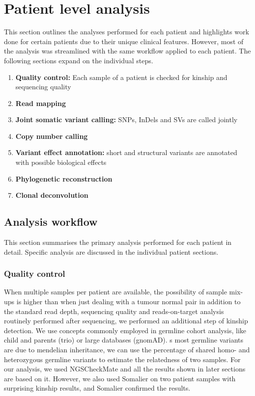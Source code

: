 \section{Patient level analysis}
\label{cascade-sec:patientLevel}
This section outlines the analyses performed for each patient and highlights work  done  for certain patients due to their unique clinical features. However, most of the analysis was streamlined with the same workflow applied to each patient. The following sections expand on the individual steps.
\begin{enumerate}
\item \textbf{Quality control:} Each sample of a patient is checked for kinship and sequencing quality
\item \textbf{Read mapping}
\item \textbf{Joint somatic variant calling:} SNPs, InDels and SVs are called jointly
\item \textbf{Copy number calling}
\item \textbf{Variant effect annotation:} short and structural variants are annotated with possible biological effects
\item \textbf{Phylogenetic reconstruction}
\item \textbf{Clonal deconvolution}
\end{enumerate}


\subsection{Analysis workflow}
\label{cascade-sec:workflow}
This section summarises the primary analysis performed for each patient in detail. Specific analysis are discussed in the individual patient sections. 

\subsubsection{Quality control}
\label{cascade-sec:qc}
When multiple samples per patient are available, the possibility of sample mix-ups is higher than when just dealing with a tumour normal pair in addition to the standard read depth, sequencing quality and reads-on-target analysis  routinely performed after sequencing, we performed an additional step of kinship detection. We use concepts commonly employed in germline cohort analysis, like child and parents (trio) or  large databases (gnomAD). s most germline variants are due to mendelian inheritance, we can use the percentage of shared homo- and heterozygous germline variants to estimate the relatedness of two samples. For our analysis, we used NGSCheckMate \cite{Lee2017} and all the results shown in later sections are based on it. However, we also used Somalier \cite{Pedersen2020} on two patient samples with surprising kinship results, and Somalier confirmed the results.

